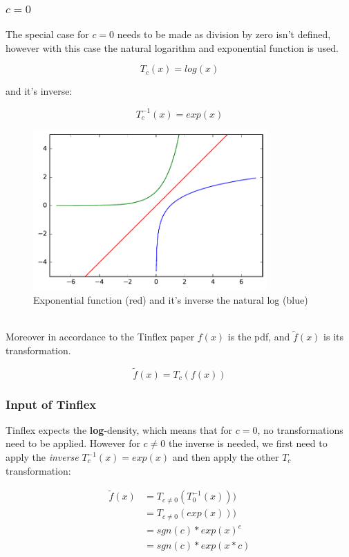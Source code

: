 \subsubsection{$c = 0$}

The special case for $c = 0$ needs to be made as division by zero isn't defined, however with this case the natural logarithm and exponential function is used.

\[T_c(x) = log(x)  \]

and it's inverse:

\[T_c^{-1}(x) = exp(x) \]

\begin{figure}[h]
\centering
\includegraphics[width=0.8\textwidth]{figs/log_exp}
\caption{Exponential function (red) and it's inverse the natural log (blue)}
\label{fig:log_exp}
\end{figure}

\ \\

Moreover in accordance to the Tinflex paper $f(x)$ is the pdf, and $\tilde{f}(x)$ is its transformation.

\[\tilde{f}(x) = T_c(f(x))  \]

\subsubsection{Input of Tinflex}

Tinflex expects the \textbf{log}-density, which means that for $c = 0$, no transformations need to be applied.
However for $c \neq 0$ the inverse is needed, we first need to apply the \textit{inverse} $T_c^{-1}(x) = exp(x)$ and then apply the other $T_c$ transformation:

\begin{align*}
\tilde{f}(x) &= T_{c \neq 0}(T_0^{-1}(x))) \\
&= T_{c \neq 0}(exp(x))) \\
&= sgn(c) * exp(x)^c \\
&= sgn(c) * exp(x *c)
\end{align*}

